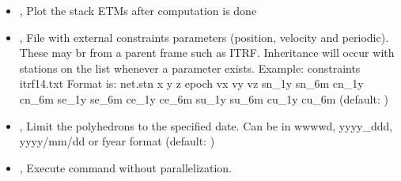 \documentclass[letterpaper,10pt,english]{sphinxmanual}
\begin{document}
\begin{itemize}
\item {} 
\sphinxAtStartPar
{\hyperref[\detokenize{pgamit.com:Stacker.py--plot}]{}}, {\hyperref[\detokenize{pgamit.com:Stacker.py---plot_stack_etms}]{}} \sphinxhyphen{} Plot the stack ETMs after computation is done

\item {} 
\sphinxAtStartPar
{\hyperref[\detokenize{pgamit.com:Stacker.py--constraints}]{}} , {\hyperref[\detokenize{pgamit.com:Stacker.py---external_constraints}]{}}  \sphinxhyphen{} File with external constraints parameters (position, velocity and periodic). These may br from a parent frame such as ITRF. Inheritance will occur with stations on the list whenever a parameter exists. Example: \sphinxhyphen{}constraints itrf14.txt Format is: net.stn x y z epoch vx vy vz sn\_1y sn\_6m cn\_1y cn\_6m se\_1y se\_6m ce\_1y ce\_6m su\_1y su\_6m cu\_1y cu\_6m (default: )

\item {} 
\sphinxAtStartPar
{\hyperref[\detokenize{pgamit.com:Stacker.py--d}]{}} , {\hyperref[\detokenize{pgamit.com:Stacker.py---date_end}]{}}  \sphinxhyphen{} Limit the polyhedrons to the specified date. Can be in wwww\sphinxhyphen{}d, yyyy\_ddd, yyyy/mm/dd or fyear format (default: )

\item {} 
\sphinxAtStartPar
{\hyperref[\detokenize{pgamit.com:Stacker.py--np}]{}}, {\hyperref[\detokenize{pgamit.com:Stacker.py---noparallel}]{}} \sphinxhyphen{} Execute command without parallelization.

\end{itemize}
\end{document}
